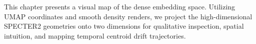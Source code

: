 
\noindent This chapter presents a visual map of the dense embedding space. Utilizing UMAP coordinates and smooth density renders, we project the high-dimensional SPECTER2 geometries onto two dimensions for qualitative inspection, spatial intuition, and mapping temporal centroid drift trajectories.

